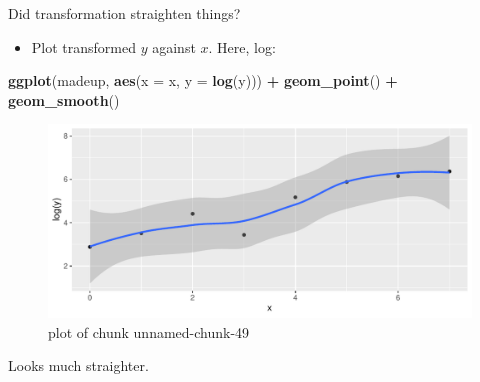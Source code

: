 \documentclass[ignorenonframetext,]{beamer}
\newenvironment{Shaded}{\begin{snugshade}}{\end{snugshade}}
\newcommand{\DataTypeTok}[1]{\textcolor[rgb]{0.13,0.29,0.53}{#1}}
\newcommand{\KeywordTok}[1]{\textcolor[rgb]{0.13,0.29,0.53}{\textbf{#1}}}
\newcommand{\NormalTok}[1]{#1}
\newcommand{\OperatorTok}[1]{\textcolor[rgb]{0.81,0.36,0.00}{\textbf{#1}}}
\newcommand{\StringTok}[1]{\textcolor[rgb]{0.31,0.60,0.02}{#1}}
\providecommand{\tightlist}{%
  \setlength{\itemsep}{0pt}\setlength{\parskip}{0pt}}
\begin{document}
\begin{frame}[fragile]{Did transformation straighten things?}
\protect\hypertarget{did-transformation-straighten-things}{}

\begin{itemize}
\tightlist
\item
  Plot transformed \(y\) against \(x\). Here, log:
\end{itemize}

\begin{Shaded}
\begin{Highlighting}[]
\KeywordTok{ggplot}\NormalTok{(madeup, }\KeywordTok{aes}\NormalTok{(}\DataTypeTok{x =}\NormalTok{ x, }\DataTypeTok{y =} \KeywordTok{log}\NormalTok{(y))) }\OperatorTok{+}\StringTok{ }\KeywordTok{geom_point}\NormalTok{() }\OperatorTok{+}
\StringTok{  }\KeywordTok{geom_smooth}\NormalTok{()}
\end{Highlighting}
\end{Shaded}

\begin{figure}
\centering
\includegraphics{figure/unnamed-chunk-49-1.pdf}
\caption{plot of chunk unnamed-chunk-49}
\end{figure}

Looks much straighter.

\end{frame}
\end{document}
